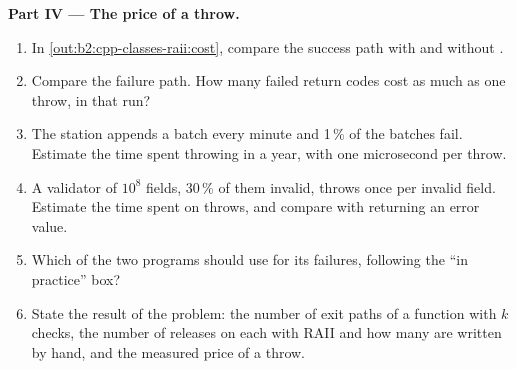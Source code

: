 \begin{problem}
\medskip\noindent\textbf{Part IV --- The price of a throw.}\par\nopagebreak
\begin{enumerate}[resume, beginpenalty=10000]
\item In \cref{out:b2:cpp-classes-raii:cost}, compare the success path with and without .
\item Compare the failure path. How many failed return codes cost as much as one throw, in that run?
\item The station appends a batch every minute and 1\,\% of the batches fail. Estimate the time spent throwing in a
year, with one microsecond per throw.
\item A validator of $10^8$ fields, 30\,\% of them invalid, throws once per invalid field. Estimate the time spent on
throws, and compare with returning an error value.
\item Which of the two programs should use  for its failures, following the ``in practice'' box?
\item State the result of the problem: the number of exit paths of a function with $k$ checks, the number of
releases on each with RAII and how many are written by hand, and the measured price of a throw.
\end{enumerate}
\end{problem}
